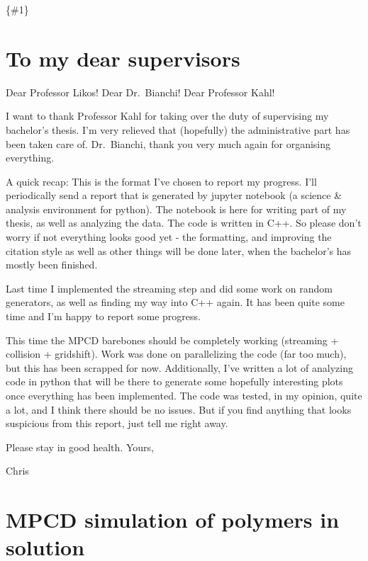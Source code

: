 \documentclass[
]{article}
\author{}
\date{}
\begin{document}
\newcommand{\matr}[1]\textbf

\{\#1\}

\newcommand{\vect}[1]{\vec{#1}}

\hypertarget{to-my-dear-supervisors}{%
\section{To my dear supervisors}\label{to-my-dear-supervisors}}

Dear Professor Likos! Dear Dr.~Bianchi! Dear Professor Kahl!

I want to thank Professor Kahl for taking over the duty of supervising
my bachelor's thesis. I'm very relieved that (hopefully) the
administrative part has been taken care of. Dr.~Bianchi, thank you very
much again for organising everything.

A quick recap: This is the format I've chosen to report my progress.
I'll periodically send a report that is generated by jupyter notebook (a
science \& analysis environment for python). The notebook is here for
writing part of my thesis, as well as analyzing the data. The code is
written in C++. So please don't worry if not everything looks good yet -
the formatting, and improving the citation style as well as other things
will be done later, when the bachelor's has mostly been finished.

Last time I implemented the streaming step and did some work on random
generators, as well as finding my way into C++ again. It has been quite
some time and I'm happy to report some progress.

This time the MPCD barebones should be completely working (streaming +
collision + gridshift). Work was done on parallelizing the code (far too
much), but this has been scrapped for now. Additionally, I've written a
lot of analyzing code in python that will be there to generate some
hopefully interesting plots once everything has been implemented. The
code was tested, in my opinion, quite a lot, and I think there should be
no issues. But if you find anything that looks suspicious from this
report, just tell me right away.

Please stay in good health. Yours,

Chris

\hypertarget{mpcd-simulation-of-polymers-in-solution}{%
\section{MPCD simulation of polymers in
solution}\label{mpcd-simulation-of-polymers-in-solution}}
\end{document}
